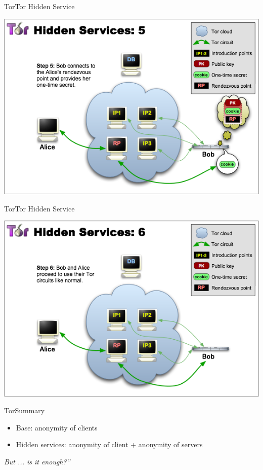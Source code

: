 \begin{frame}{Tor}{Tor Hidden Service}
\begin{center}
	\includegraphics[scale=0.45]{imgs/THS-5.png}
\end{center}
\end{frame}

\begin{frame}{Tor}{Tor Hidden Service}
\begin{center}
	\includegraphics[scale=0.45]{imgs/THS-6.png}
\end{center}
\end{frame}

\begin{frame}{Tor}{Summary}
\begin{center}
	\begin{itemize}
		\item Base: anonymity of clients
		\item Hidden services: anonymity of client + anonymity of servers
	\end{itemize}
	
	\begin{center}
			\large{\emph{But ... is it enough?''}}
	\end{center}

\end{center}
\end{frame}
